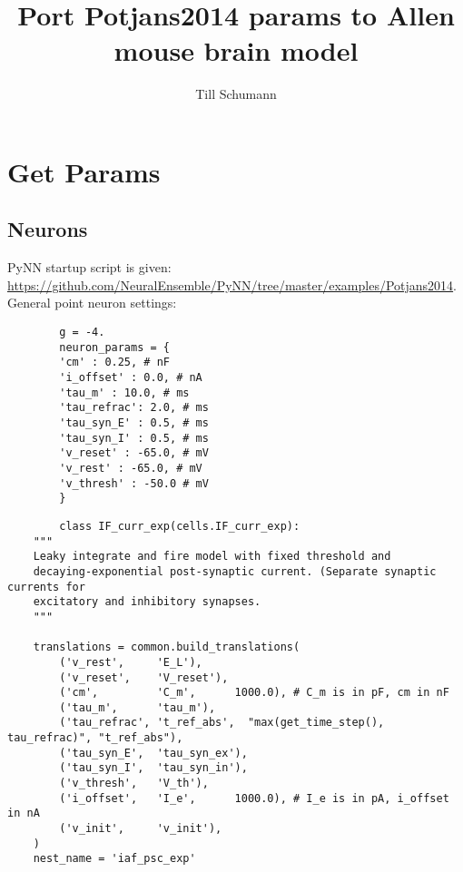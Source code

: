 \documentclass[a4paper]{article}
\title{ Port Potjans2014 params to Allen mouse brain model }
\author{Till Schumann}
\begin{document}
   \maketitle

\section{Get Params}

	\subsection{Neurons}
	PyNN startup script is given: \url{https://github.com/NeuralEnsemble/PyNN/tree/master/examples/Potjans2014}.
	General point neuron settings:
	
	\begin{lstlisting}
		g = -4.
		neuron_params = {
		'cm' : 0.25, # nF
		'i_offset' : 0.0, # nA
		'tau_m' : 10.0, # ms
		'tau_refrac': 2.0, # ms
		'tau_syn_E' : 0.5, # ms
		'tau_syn_I' : 0.5, # ms
		'v_reset' : -65.0, # mV
		'v_rest' : -65.0, # mV
		'v_thresh' : -50.0 # mV
		}
	\end{lstlisting}
	

	
	\begin{lstlisting}
		class IF_curr_exp(cells.IF_curr_exp):
    """
    Leaky integrate and fire model with fixed threshold and
    decaying-exponential post-synaptic current. (Separate synaptic currents for
    excitatory and inhibitory synapses.
    """
    
    translations = common.build_translations(
        ('v_rest',     'E_L'),
        ('v_reset',    'V_reset'),
        ('cm',         'C_m',      1000.0), # C_m is in pF, cm in nF
        ('tau_m',      'tau_m'),
        ('tau_refrac', 't_ref_abs',  "max(get_time_step(), tau_refrac)", "t_ref_abs"),
        ('tau_syn_E',  'tau_syn_ex'),
        ('tau_syn_I',  'tau_syn_in'),
        ('v_thresh',   'V_th'),
        ('i_offset',   'I_e',      1000.0), # I_e is in pA, i_offset in nA
        ('v_init',     'v_init'),
    )
    nest_name = 'iaf_psc_exp'
	\end{lstlisting}
	
\end{document}
